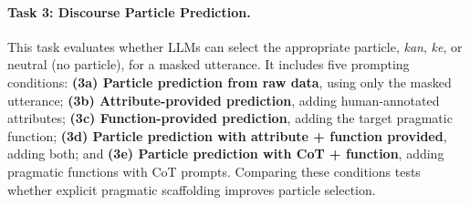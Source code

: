 \documentclass[11pt]{article}
\begin{document}

\paragraph{Task 3: Discourse Particle Prediction.} 

This task evaluates whether LLMs can select the appropriate particle, \textit{kan}, \textit{ke}, or neutral (no particle), for a masked utterance. 
It includes five prompting conditions: \textbf{(3a) Particle prediction from raw data}, using only the masked utterance; \textbf{(3b) Attribute-provided prediction}, adding human-annotated attributes; \textbf{(3c) Function-provided prediction}, adding the target pragmatic function; \textbf{(3d) Particle prediction with attribute + function provided}, adding both; and \textbf{(3e) Particle prediction with CoT + function}, adding pragmatic functions with CoT prompts. Comparing these conditions tests whether explicit pragmatic scaffolding improves particle selection.
\end{document}
